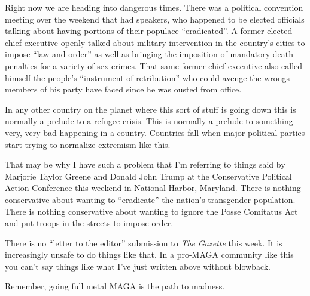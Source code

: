 Right now we are heading into dangerous times. There was a political
convention meeting over the weekend that had speakers, who happened to
be elected officials talking about having portions of their populace
``eradicated''. A former elected chief executive openly talked about
military intervention in the country's cities to impose ``law and
order'' as well as bringing the imposition of mandatory death penalties
for a variety of sex crimes. That same former chief executive also
called himself the people's ``instrument of retribution'' who could
avenge the wrongs members of his party have faced since he was ousted
from office.

In any other country on the planet where this sort of stuff is going
down this is normally a prelude to a refugee crisis. This is normally a
prelude to something very, very bad happening in a country. Countries
fall when major political parties start trying to normalize extremism
like this.

That may be why I have such a problem that I'm referring to things said
by Marjorie Taylor Greene and Donald John Trump at the Conservative
Political Action Conference this weekend in National Harbor, Maryland.
There is nothing conservative about wanting to ``eradicate'' the
nation's transgender population. There is nothing conservative about
wanting to ignore the Posse Comitatus Act and put troops in the streets
to impose order.

There is no ``letter to the editor'' submission to \emph{The Gazette}
this week. It is increasingly unsafe to do things like that. In a
pro-MAGA community like this you can't say things like what I've just
written above without blowback.

Remember, going full metal MAGA is the path to madness.
